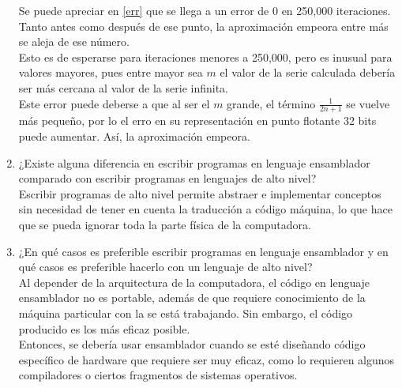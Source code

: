 \documentclass{article}
\begin{document}
\begin{enumerate}
{\begin{enumerate}
\begin{figure}[H]
                \end{figure}            
                Se puede apreciar en \eqref{err} que se llega a un error de 0 en
                250,000 iteraciones. Tanto antes como después de ese punto, la
                aproximación empeora entre más se aleja de ese número.\\
                Esto es de esperarse para iteraciones menores a 250,000, pero 
                es inusual para valores mayores, pues entre mayor sea $m$ el valor
                de la serie calculada debería ser más cercana al valor de la 
                serie infinita.\\
                Este error puede deberse a que al ser el $m$ grande, el término
                $\frac{1}{2n+1}$ se vuelve más pequeño, por lo el erro en su
                representación en punto flotante 32 bits puede aumentar.
                Así, la aproximación empeora.
            \end{enumerate}
        }
        \item ¿Existe alguna diferencia en escribir programas en lenguaje 
        ensamblador comparado con escribir programas en lenguajes de alto nivel?\\
        Escribir programas de alto nivel permite abstraer e implementar conceptos
        sin necesidad de tener en cuenta la traducción a código máquina, lo que
        hace que se pueda ignorar toda la parte física de la computadora.
        \item ¿En qué casos es preferible escribir programas en lenguaje 
        ensamblador y en qué casos es preferible hacerlo con un lenguaje de alto
        nivel?\\
        Al depender de la arquitectura de la computadora, el código en lenguaje
        ensamblador no es portable, además de que requiere conocimiento de la
        máquina particular con la se está trabajando. Sin embargo, el código
        producido es los más eficaz posible.\\
        Entonces, se debería usar ensamblador cuando se esté diseñando código
        específico de hardware que requiere ser muy eficaz, como lo requieren
        algunos compiladores o ciertos fragmentos de sistemas operativos.
        
    \end{enumerate}
\end{document}
